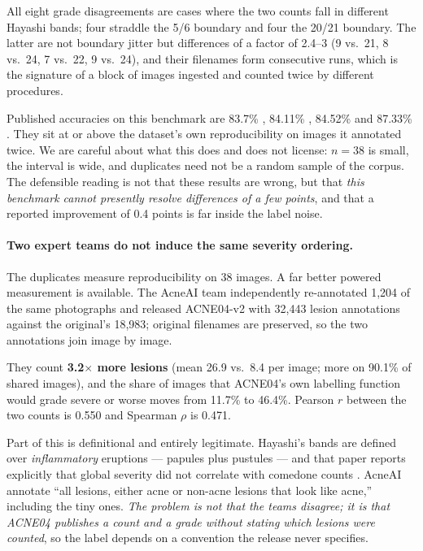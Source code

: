 \documentclass[11pt]{article}
\begin{document}
All eight grade disagreements are cases where the two counts fall in different Hayashi
bands; four straddle the 5/6 boundary and four the 20/21 boundary. The latter are not
boundary jitter but differences of a factor of 2.4--3 (9 vs.\ 21, 8 vs.\ 24, 7 vs.\ 22,
9 vs.\ 24), and their filenames form consecutive runs, which is the signature of a
block of images ingested and counted twice by different procedures.

Published accuracies on this benchmark are 83.7\% \citep{wu2019}, 84.11\%
\citep{lds2024}, 84.52\% \citep{kieglfn2022} and 87.33\% \citep{ffpll2025}. They sit at or above the
dataset's own reproducibility on images it annotated twice. We are careful about what
this does and does not license: $n=38$ is small, the interval is wide, and duplicates
need not be a random sample of the corpus. The defensible reading is not that these
results are wrong, but that \emph{this benchmark cannot presently resolve differences
of a few points}, and that a reported improvement of 0.4 points is far inside the
label noise.

\paragraph{Two expert teams do not induce the same severity ordering.}
The duplicates measure reproducibility on 38 images. A far better powered measurement
is available. The AcneAI team \citep{acneai2024} independently re-annotated 1{,}204 of
the same photographs and released ACNE04-v2 with 32{,}443 lesion annotations against
the original's 18{,}983; original filenames are preserved, so the two annotations join
image by image.

They count \textbf{3.2$\times$ more lesions} (mean 26.9 vs.\ 8.4 per image; more on
90.1\% of shared images), and the share of images that ACNE04's own labelling function
would grade severe or worse moves from 11.7\% to 46.4\%. Pearson $r$ between the two
counts is 0.550 and Spearman $\rho$ is 0.471.

Part of this is definitional and entirely legitimate. Hayashi's bands are defined over
\emph{inflammatory} eruptions --- papules plus pustules --- and that paper reports
explicitly that global severity did not correlate with comedone counts
\citep{hayashi2008}. AcneAI annotate ``all lesions, either acne or non-acne lesions
that look like acne,'' including the tiny ones. \emph{The problem is not that the teams
disagree; it is that ACNE04 publishes a count and a grade without stating which lesions
were counted}, so the label depends on a convention the release never specifies.
\end{document}
